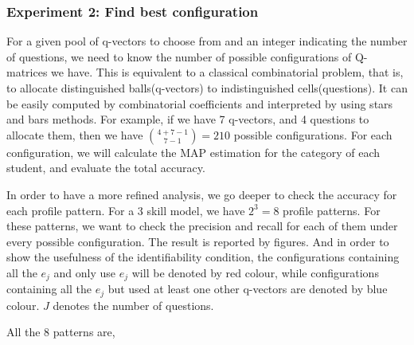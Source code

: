 \documentclass{edm_template-no-copyright}
\begin{document}
\subsubsection{Experiment 2: Find best configuration}
For a given pool of q-vectors to choose from and an integer indicating the number of questions, we need to know the number of possible configurations of Q-matrices we have. This is equivalent to a classical combinatorial problem, that is, to allocate distinguished balls(q-vectors) to indistinguished cells(questions). It can be easily computed by combinatorial coefficients and interpreted by using stars and bars methods. For example, if we have 7 q-vectors, and 4 questions to allocate them, then we have ${{4+7-1}\choose {7-1}}=210$ possible configurations. For each configuration, we will calculate the MAP estimation for the category of each student, and evaluate the total accuracy.

In order to have a more refined analysis, we go deeper to check the accuracy for each profile pattern. For a 3 skill model, we have $2^3=8$ profile patterns. For these patterns, we want to check the precision and recall for each of them under every possible configuration. The result is reported by figures. And in order to show the usefulness of the identifiability condition, the configurations containing all the ${e_j}$ and only use ${e_j}$ will be denoted by red colour, while configurations containing all the ${e_j}$ but used at least one other q-vectors are denoted by blue colour. $J$ denotes the number of questions.

All the 8 patterns are,
\end{document}
